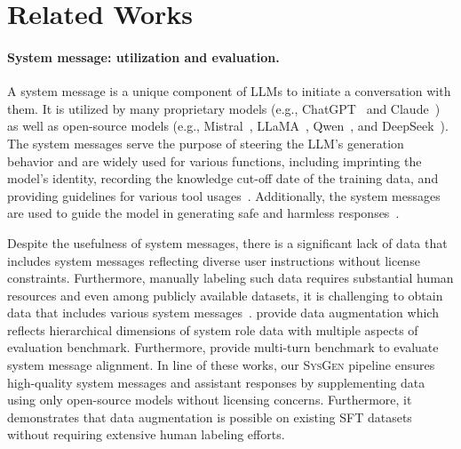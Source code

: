 \section{Related Works}

\paragraph{System message: utilization and evaluation.}
A system message is a unique component of LLMs to initiate a conversation with them.
It is utilized by many proprietary models (e.g.,  ChatGPT~\citep{openai2023b} and Claude~\citep{anthropic2024}) as well as open-source models (e.g.,  Mistral~\citep{alkhamissi2024investigating}, LLaMA~\citep{meta2024introducing}, Qwen~\citep{yang2025qwen2}, and DeepSeek~\citep{guo2025deepseek}).
The system messages serve the purpose of steering the LLM's generation behavior and are widely used for various functions, including imprinting the model's identity, recording the knowledge cut-off date of the training data, and providing guidelines for various tool usages~\citep{openai2024function, cohere2024, prompthub2025}.
Additionally, the system messages are used to guide the model in generating safe and harmless responses~\citep{touvron2023llama, lu2024sofa, wallace2404instruction}.

Despite the usefulness of system messages, there is a significant lack of data that includes system messages reflecting diverse user instructions without license constraints.
Furthermore, manually labeling such data requires substantial human resources and even among publicly available datasets, it is challenging to obtain data that includes various system messages~\citep{lin2024baichuan, xu2024magpie}.
\citet{lee2024aligning} provide data augmentation which reflects hierarchical dimensions of system role data with multiple aspects of evaluation benchmark.
Furthermore, \citet{qin2024sysbench} provide multi-turn benchmark to evaluate system message alignment.
In line of these works, our \textsc{SysGen} pipeline  ensures high-quality system messages and assistant responses by supplementing data using only open-source models without licensing concerns.
Furthermore, it demonstrates that data augmentation is possible on existing SFT datasets without requiring extensive human labeling efforts.


